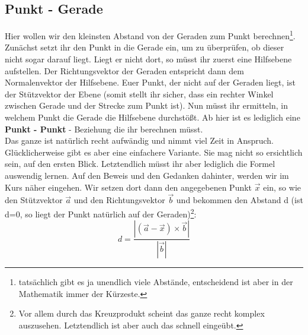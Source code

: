 \subsection{Punkt - Gerade}
Hier wollen wir den kleinsten Abstand von der Geraden zum Punkt berechnen\footnote{tatsächlich gibt es ja unendlich viele Abstände, entscheidend ist aber in der Mathematik immer der Kürzeste.}.\\
Zunächst setzt ihr den Punkt in die Gerade ein, um zu überprüfen, ob dieser nicht sogar darauf liegt. Liegt er nicht dort, so müsst ihr zuerst eine Hilfsebene aufstellen. Der Richtungsvektor der Geraden entspricht dann dem Normalenvektor der Hilfsebene. Euer Punkt, der nicht auf der Geraden liegt, ist der Stützvektor der Ebene (somit stellt ihr sicher, dass ein rechter Winkel zwischen Gerade und der Strecke zum Punkt ist). Nun müsst ihr ermitteln, in welchem Punkt die Gerade die Hilfsebene durchstößt. Ab hier ist es lediglich eine \textbf{Punkt - Punkt} - Beziehung die ihr berechnen müsst.\\
Das ganze ist natürlich recht aufwändig und nimmt viel Zeit in Anspruch. Glücklicherweise gibt es aber eine einfachere Variante. Sie mag nicht so ersichtlich sein, auf den ersten Blick. Letztendlich müsst ihr aber lediglich die Formel auswendig lernen. Auf den Beweis und den Gedanken dahinter, werden wir im Kurs näher eingehen. Wir setzen dort dann den angegebenen Punkt \(\vec{x}\) ein, so wie den Stützvektor \(\vec{a}\) und den Richtungsvektor \(\vec{b}\) und bekommen den Abstand d (ist d=0, so liegt der Punkt natürlich auf der Geraden)\footnote{Vor allem durch das Kreuzprodukt scheint das ganze recht komplex auszusehen. Letztendlich ist aber auch das schnell eingeübt.}:
\[d=\frac{|(\vec{a}-\vec{x})\times \vec{b}|}{|\vec{b}|}\]
